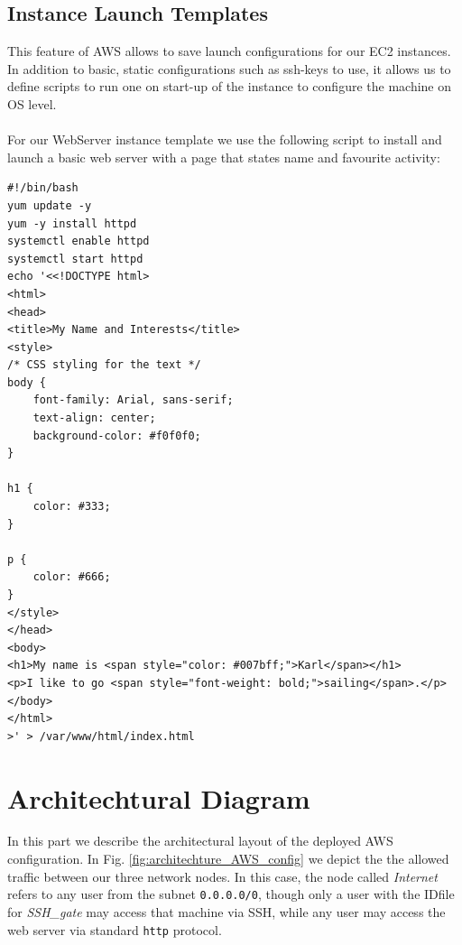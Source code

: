 \subsection*{Instance Launch Templates}
\label{subsec:templates}
This feature of AWS allows to save launch configurations for our EC2 instances. In addition to basic, static configurations such as ssh-keys to use, it allows us to define scripts to run one on start-up of the instance to configure the machine on OS level.\\
\\
For our WebServer instance template we use the following script to install and launch a basic web server with a page that states name and favourite activity:
\begin{lstlisting}
#!/bin/bash
yum update -y
yum -y install httpd
systemctl enable httpd
systemctl start httpd
echo '<<!DOCTYPE html>
<html>
<head>
<title>My Name and Interests</title>
<style>
/* CSS styling for the text */
body {
	font-family: Arial, sans-serif;
	text-align: center;
	background-color: #f0f0f0;
}

h1 {
	color: #333;
}

p {
	color: #666;
}
</style>
</head>
<body>
<h1>My name is <span style="color: #007bff;">Karl</span></h1>
<p>I like to go <span style="font-weight: bold;">sailing</span>.</p>
</body>
</html>
>' > /var/www/html/index.html
\end{lstlisting}

\section{Architechtural Diagram}

In this part we describe the architectural layout of the deployed AWS configuration. In Fig. \ref{fig:architechture_AWS_config} we depict the the allowed traffic between our three network nodes. In this case, the node called \textsl{Internet} refers to any user from the subnet \texttt{0.0.0.0/0}, though only a user with the IDfile for \textsl{SSH\_gate} may access that machine via SSH, while any user may access the web server via standard \texttt{http} protocol.


